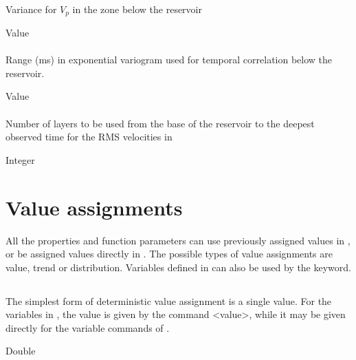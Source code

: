 {\paragraph{}
 \slist
   \item \Description Variance for $V_p$ in the zone below the reservoir
   \item \Argument Value
   \item \Default
 \elist

\paragraph{}
 \slist
   \item \Description Range (ms) in exponential variogram used for temporal correlation below the reservoir.
   \item \Argument Value
   \item \Default
 \elist

\paragraph{}
 \slist
   \item \Description Number of layers to be used from the base of the reservoir to the deepest observed time for the RMS velocities in 
   \item \Argument Integer
   \item \Default
 \elist

\section{Value assignments}
\label{sec:valueassignment}
All the properties and function parameters can use previously assigned values in , or be assigned values directly in . The possible types of value assignments are value, trend or distribution. Variables defined in  can also be used by the  keyword.

\subsection{}
 \slist
   \item \Description The simplest form of deterministic value assignment is a single value. For the variables in , the value is given by the command <value>, while it may be given directly for the variable commands of .
   \item \Argument Double
   \item \Default
 \elist

}
